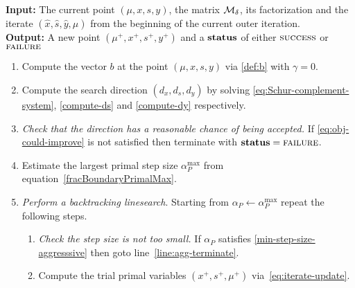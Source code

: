 \documentclass{article}
\begin{document}
\begin{algorithm}[H]
\textbf{Input:} The current point $(\mu, x, s, y)$, the matrix $\mathcal{M}_{\delta}$, its factorization and the iterate $(\hat{x}, \hat{s},  \hat{y}, \hat{\mu})$ from the beginning of the current outer iteration.  \\
\textbf{Output:} A new point $(\mu^{+}, x^{+}, s^{+}, y^{+})$ and a $\textbf{status}$ of either $\textsc{success}$ or $\textsc{failure}$
\begin{enumerate}[label*=A.{\arabic*}]
\item Compute the vector $b$ at the point $(\mu, x, s, y)$ via \eqref{def:b} with $\gamma = 0$.
\item Compute the search direction $(d_{x}, d_{s}, d_{y})$ by solving \eqref{eq:Schur-complement-system}, \eqref{compute-ds} and \eqref{compute-dy} respectively.
\item \emph{Check that the direction has a reasonable chance of being accepted.} If \eqref{eq:obj-could-improve} is not satisfied then terminate with $\textbf{status} = \textsc{failure}$.
\item Estimate the largest primal step size $\alpha^{\max}_{P}$ from equation~\eqref{fracBoundaryPrimalMax}.
\item \label{agg:line:back-track} \emph{Perform a backtracking linesearch}. Starting from $\alpha_{P} \gets \alpha^{\max}_{P}$ repeat the following steps.
\begin{enumerate}[label*=.{\arabic*}]
\item \label{line:agg-back-too-small} \emph{Check the step size is not too small.} If $\alpha_{P}$ satisfies \eqref{min-step-size-aggresssive} then goto line~\ref{line:agg-terminate}.
\item Compute the trial primal variables $(x^{+}, s^{+}, \mu^{+})$ via~\eqref{eq:iterate-update}.

\end{enumerate}
\end{enumerate}
\end{algorithm}
\end{document}
